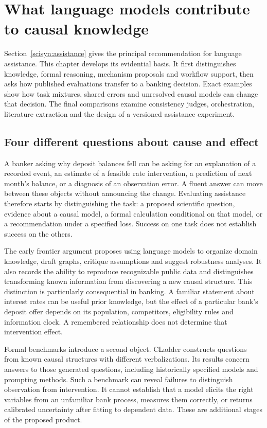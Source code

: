 \chapter{What language models contribute to causal knowledge}
\label{la:frontier}

Section~\ref{scisyn:assistance} gives the principal recommendation for language
assistance. This chapter develops its evidential basis. It first distinguishes
knowledge, formal reasoning, mechanism proposals and workflow support, then
asks how published evaluations transfer to a banking decision. Exact examples
show how task mixtures, shared errors and unresolved causal models can change
that decision. The final comparisons examine consistency judges, orchestration,
literature extraction and the design of a versioned assistance experiment.

\section{Four different questions about cause and effect}

A banker asking why deposit balances fell can be asking for an explanation of
a recorded event, an estimate of a feasible rate intervention, a prediction of
next month's balance, or a diagnosis of an observation error. A fluent answer
can move between these objects without announcing the change. Evaluating assistance therefore starts by distinguishing the task: a proposed scientific question, evidence about a causal model,
a formal calculation conditional on that model, or a recommendation under a
specified loss. Success on one task does not establish success on the others.

The early frontier argument proposes using language models to organize domain
knowledge, draft graphs, critique assumptions and suggest robustness analyses.
It also records the ability to reproduce recognizable public data and
distinguishes transforming known information from discovering a new causal
structure. \citep{v12_la_2305_00050} This distinction is particularly consequential
in banking. A familiar statement about interest rates can be useful prior
knowledge, but the effect of a particular bank's deposit offer depends on its
population, competitors, eligibility rules and information clock. A remembered
relationship does not determine that intervention effect.

Formal benchmarks introduce a second object. CLadder constructs questions from
known causal structures with different verbalizations. Its results concern
answers to those generated questions, including historically specified models
and prompting methods. \citep{v12_la_2312_04350} Such a benchmark can reveal failures
to distinguish observation from intervention. It cannot establish that a model
elicits the right variables from an unfamiliar bank process, measures them
correctly, or returns calibrated uncertainty after fitting to dependent data.
These are additional stages of the proposed product.

